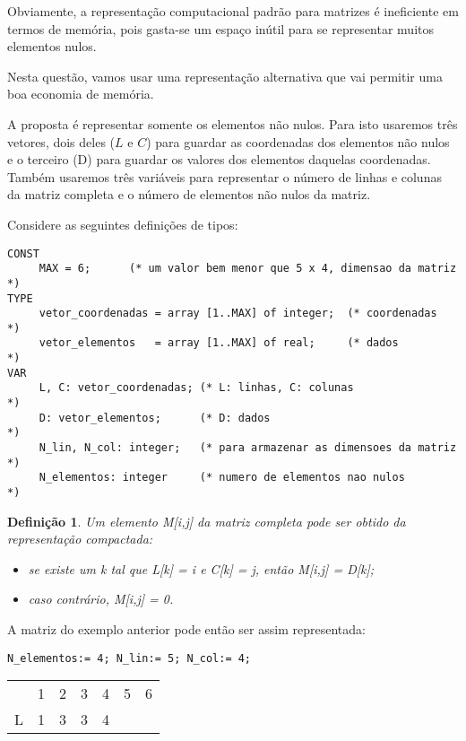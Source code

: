 \begin{enumerate}
Obviamente, a representação computacional padrão para matrizes é
ineficiente em termos de memória, pois gasta-se um espaço inútil para
se representar muitos elementos nulos. 

Nesta questão, vamos usar uma representação alternativa que vai permitir
uma boa economia de memória. 

A proposta é representar somente os elementos não nulos. Para isto usaremos
três vetores, dois deles ($L$ e $C$) 
para guardar as coordenadas dos elementos não nulos
e o terceiro (D) para guardar os valores dos elementos daquelas coordenadas. 
Também
usaremos três variáveis para representar o número de linhas e colunas
da matriz completa e o número de elementos não nulos da matriz.

Considere as seguintes definições de tipos:
\begin{lstlisting}
CONST
     MAX = 6;      (* um valor bem menor que 5 x 4, dimensao da matriz *) 
TYPE 
     vetor_coordenadas = array [1..MAX] of integer;  (* coordenadas    *)
     vetor_elementos   = array [1..MAX] of real;     (* dados          *)
VAR
     L, C: vetor_coordenadas; (* L: linhas, C: colunas                 *)
     D: vetor_elementos;      (* D: dados                              *)
     N_lin, N_col: integer;   (* para armazenar as dimensoes da matriz *)
     N_elementos: integer     (* numero de elementos nao nulos         *)
\end{lstlisting}


\newtheorem{definicao}{Definição}

\begin{definicao}
\label{def1}
Um elemento M[i,j] da matriz completa pode ser 
obtido da representação compactada: 

\begin{itemize}
\item se existe um k tal que L[k] = i e C[k] = j, então M[i,j] = D[k];
\item caso contrário, M[i,j] = 0.
\end{itemize} 
\end{definicao}

A matriz do exemplo anterior pode então ser assim representada:

\begin{verbatim}
N_elementos:= 4; N_lin:= 5; N_col:= 4;
\end{verbatim}

\begin{center}
\begin{tabular}{c|p{.6cm}|p{.6cm}|p{.6cm}|p{.6cm}|p{.6cm}|p{.6cm}|} 
\multicolumn{1}{c}{} & \multicolumn{1}{c}{1} & \multicolumn{1}{c}{2} & \multicolumn{1}{c}{
3} & \multicolumn{1}{c}{4} & \multicolumn{1}{c}{5} & \multicolumn{1}{c}{6}\\ \cline{2-7}
L & 1  & 3  & 3   & 4 & & \\ \cline{2-7}
\end{tabular}



\end{center}
\end{enumerate}
